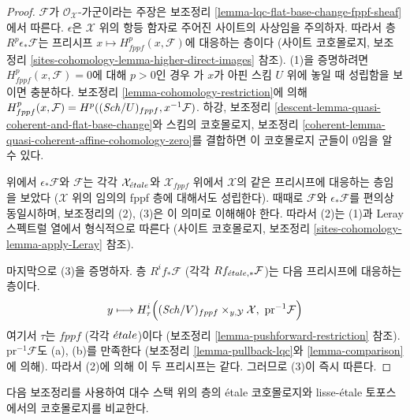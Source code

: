 \begin{proof}
 $\mathcal{F}$가 $\mathcal{O}_\mathcal{X}$-가군이라는 주장은
보조정리 \ref{lemma-lqc-flat-base-change-fppf-sheaf}에서 따른다.
$\epsilon$은 $\mathcal{X}$ 위의 항등 함자로 주어진 사이트의
사상임을 주의하자. 따라서 층 $R^p\epsilon_*\mathcal{F}$는
프리시프
$x \mapsto H^p_{fppf}(x, \mathcal{F})$에 대응하는 층이다
(사이트 코호몰로지, 보조정리
\ref{sites-cohomology-lemma-higher-direct-images} 참조).
(1)을 증명하려면
$H^p_{fppf}(x, \mathcal{F}) = 0$에 대해 $p > 0$인 경우
가 $x$가 아핀 스킴 $U$ 위에 놓일 때 성립함을 보이면 충분하다.
보조정리 \ref{lemma-cohomology-restriction}에 의해
$H^p_{fppf}(x, \mathcal{F}) = H^p((\mathit{Sch}/U)_{fppf}, x^{-1}\mathcal{F})$.
하강, 보조정리 \ref{descent-lemma-quasi-coherent-and-flat-base-change}와
스킴의 코호몰로지, 보조정리
\ref{coherent-lemma-quasi-coherent-affine-cohomology-zero}를 결합하면
이 코호몰로지 군들이 0임을 알 수 있다.

\medskip\noindent
위에서 $\epsilon_*\mathcal{F}$와 $\mathcal{F}$는 각각
$\mathcal{X}_{\acute{e}tale}$와 $\mathcal{X}_{fppf}$ 위에서
$\mathcal{X}$의 같은 프리시프에 대응하는 층임을 보았다
($\mathcal{X}$ 위의 임의의 fppf 층에 대해서도 성립한다).
때때로 $\mathcal{F}$와 $\epsilon_*\mathcal{F}$를 편의상 동일시하며,
보조정리의 (2), (3)은 이 의미로 이해해야 한다.
따라서 (2)는 (1)과 Leray 스펙트럴 열에서 형식적으로 따른다
(사이트 코호몰로지, 보조정리
\ref{sites-cohomology-lemma-apply-Leray} 참조).

\medskip\noindent
마지막으로 (3)을 증명하자. 층 $R^if_*\mathcal{F}$
(각각 $Rf_{{\acute{e}tale},*}\mathcal{F}$)는 다음 프리시프에 대응하는 층이다.
$$
y \longmapsto
H^i_\tau\Big((\mathit{Sch}/V)_{fppf} \times_{y, \mathcal{Y}} \mathcal{X},
\ \text{pr}^{-1}\mathcal{F}\Big)
$$
여기서 $\tau$는 $fppf$ (각각 ${\acute{e}tale}$)이다
(보조정리 \ref{lemma-pushforward-restriction} 참조).
$\text{pr}^{-1}\mathcal{F}$도 (a), (b)를 만족한다
(보조정리 \ref{lemma-pullback-lqc}와 \ref{lemma-comparison}에 의해).
따라서 (2)에 의해 이 두 프리시프는 같다.
그러므로 (3)이 즉시 따른다.
\end{proof}

\noindent
다음 보조정리를 사용하여 대수 스택 위의 층의
\'etale 코호몰로지와 lisse-\'etale 토포스에서의 코호몰로지를 비교한다.

